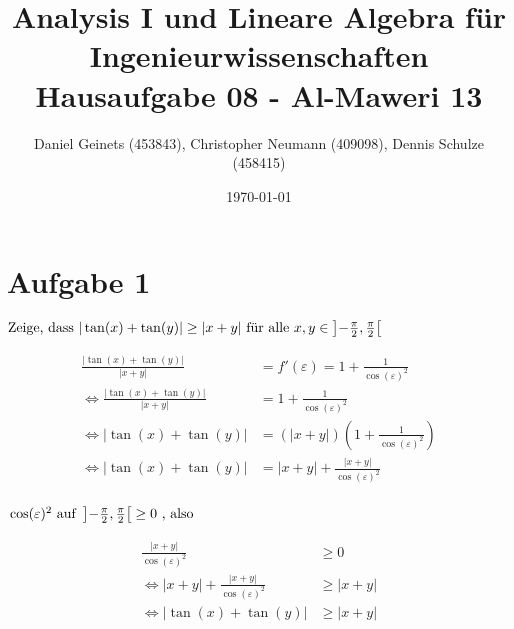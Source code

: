 \documentclass[a4paper, 11pt]{article}
\author{Daniel Geinets (453843), Christopher Neumann (409098), Dennis Schulze (458415)}
\date{\today}
\title{Analysis I und Lineare Algebra für Ingenieurwissenschaften \large  \\ Hausaufgabe 08 - Al-Maweri 13}
\begin{document}
\maketitle
\tableofcontents

\setcounter{secnumdepth}{0}
\newcommand{\tuple}[1]{\left(#1\right)}
\newcommand{\R}{\mathbb{R}}
\newcommand{\Z}{\mathbb{Z}}
\newcommand{\Q}{\mathbb{Q}}
\newcommand{\N}{\mathbb{N}}
\newcommand{\C}{\mathbb{C}}

\makeatletter
\renewcommand*\env@matrix[1][*\c@MaxMatrixCols c]{%
\hskip -\arraycolsep
\let\@ifnextchar\new@ifnextchar
\array{#1}}
\makeatother

\pagebreak

\section{Aufgabe 1}
\label{sec:orga3882f8}
\begin{math}
    \text{Zeige, dass  }|\tan(x)+\tan(y)| \geq |x+y|
        \text{  für alle  }x,y \in \left]-\frac{\pi}{2}, \frac{\pi}{2} \right[
    \newline
    \newline
\end{math}

\begin{align*}
    \frac{|\tan(x)+\tan(y)|}{|x+y|} &= f'(\varepsilon) = 1+\frac{1}{\cos(\varepsilon)^2} \\
    \Leftrightarrow   \frac{|\tan(x)+\tan(y)|}{|x+y|} &= 1+\frac{1}{\cos(\varepsilon)^2} \\
    \Leftrightarrow |\tan(x)+\tan(y)| &= (|x+y|)\left(1+\frac{1}{\cos(\varepsilon)^2}\right)\\
    \Leftrightarrow |\tan(x)+\tan(y)| &= |x+y|+\frac{|x+y|}{\cos(\varepsilon)^2}\\
\end{align*}

\begin{math}
    \newline
    \cos(\varepsilon)^2 \text{  auf  } \left]-\frac{\pi}{2}, \frac{\pi}{2} \right[
        \geq 0 \text{  , also}
    \newline
\end{math}

\begin{align*}
    \frac{|x+y|}{\cos(\varepsilon)^2} &\geq 0 \\
    \Leftrightarrow|x+y|+\frac{|x+y|}{\cos(\varepsilon)^2} &\geq |x+y| \\
    \Leftrightarrow|\tan(x)+\tan(y)| &\geq |x+y|
\end{align*}
\end{document}
